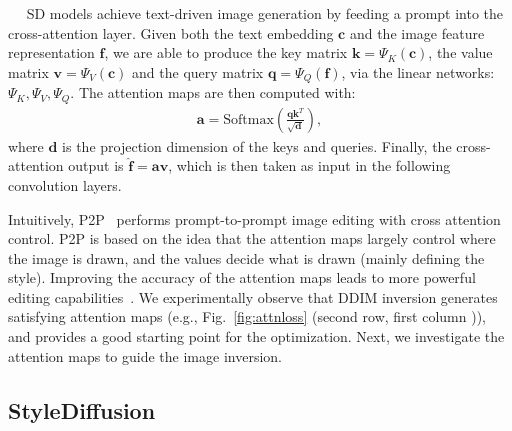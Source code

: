 \documentclass[twocolumn]{svjour3}          \smartqed  \usepackage{graphicx}
\newcommand{\minisection}[1]{\vspace{0.04in} \noindent {\bf #1}\ \ }
\begin{document}
\minisection{Cross-attention.} SD models achieve text-driven image generation by feeding a prompt into the cross-attention layer.  Given both the text embedding $\mathbf{c}$ and  the image feature representation $\mathbf{f}$,  
we are able to produce the key matrix $\mathbf{k}= \Psi_K(\mathbf{c})$,  the value matrix $\mathbf{v}= \Psi_V(\mathbf{c})$ and the query matrix $\mathbf{q}= \Psi_Q(\mathbf{f})$,  via the  linear networks:  $\Psi_K, \Psi_V,\Psi_Q$. The attention maps are then  computed with:
\begin{equation}
\begin{aligned}\label{eq:atten_softmax}
\mathbf{a}= \text{Softmax}(\frac{\mathbf{q}\mathbf{k}^{T}}{\sqrt{\mathbf{d}}}),
\end{aligned}
\end{equation}
where $\mathbf{d}$ is the projection dimension of the keys and queries.  Finally, the cross-attention output is $\mathbf{\hat{f}} = \mathbf{a}\mathbf{v}$, which is then taken as input in the following  convolution layers. 


Intuitively, P2P~\citep{hertz2022prompt} performs prompt-to-prompt image editing  with cross attention control. P2P is based on the idea that the attention maps largely control where the image is drawn, and the values decide what is drawn (mainly defining the style). 
Improving the accuracy of the attention maps leads to more powerful editing capabilities~\citep{mokady2022null}.
  We experimentally observe that DDIM inversion generates satisfying attention maps (e.g., Fig.~\ref{fig:attnloss} (second row, first column )), 
and provides a good starting point for the optimization. Next, we investigate the attention maps to guide the image inversion.

\subsection{StyleDiffusion}
\label{subsec:stylediffusion}
\end{document}
